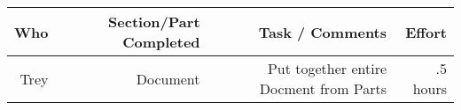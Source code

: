 \clearpage

\begin{table}[!h]
    \begin{tabular}{rrrr}
   	\hline
	 Who   & Section/Part Completed & Task / Comments & Effort \\
	 \hline
	  Trey  & Document & Put together entire Docment from Parts & .5 hours \\
 	 \hline
    \end{tabular}
\end{table}
